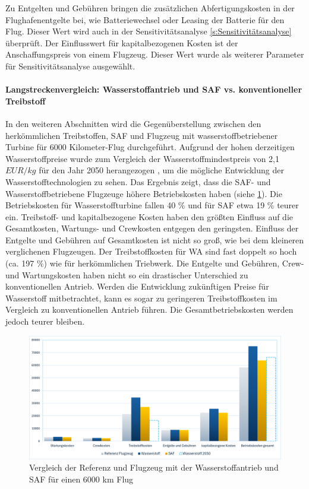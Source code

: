 Zu Entgelten und Gebühren bringen die zusätzlichen Abfertigungskosten in der Flughafenentgelte bei, wie Batteriewechsel oder Leasing der Batterie
für den Flug. Dieser Wert wird auch in der Sensitivitätsanalyse \ref{s:Sensitivitätsanalyse} überprüft. Der Einflusswert für kapitalbezogenen Kosten ist
der Anschaffungspreis von einem Flugzeug. Dieser Wert wurde als weiterer Parameter für Sensitivitätsanalyse ausgewählt.\\

\paragraph{Langstreckenvergleich: Wasserstoffantrieb und SAF vs. konventioneller Treibstoff}
In den weiteren Abschnitten wird die Gegenüberstellung zwischen den herkömmlichen Treibstoffen, SAF
und Flugzeug mit wasserstoffbetriebener Turbine für 6000 Kilometer-Flug durchgeführt. %
Aufgrund der hohen derzeitigen Wasserstoffpreise wurde zum Vergleich der Wasserstoffmindestpreis von 2,1 $EUR/kg$ für den 
Jahr 2050 herangezogen \cite{hoelzen2022hydrogen}, um die mögliche Entwicklung der Wasserstofftechnologien zu sehen.
%
Das Ergebnis zeigt, dass die SAF- und Wasserstoffbetriebene Flugzeuge höhere Betriebskosten haben (siehe \ref{vergleichWA_Ref}).
Die Betriebskosten für Wasserstoffturbine fallen 40 \% und für SAF etwa 19 \% teurer ein.
Treibstoff- und kapitalbezogene Kosten haben den größten Einfluss auf die Gesamtkosten, Wartungs- und Crewkosten entgegen den geringsten.
Einfluss der Entgelte und Gebühren auf Gesamtkosten ist nicht so groß, wie bei dem kleineren verglichenen Flugzeugen.
Der Treibstoffkosten für WA sind fast doppelt so hoch (ca. 197 \%) wie für herkömmlichen Triebwerk. Die Entgelte und Gebühren, 
Crew- und Wartungskosten haben nicht so ein drastischer Unterschied zu konventionellen Antrieb. 
%
Werden die Entwicklung zukünftigen Preise für Wasserstoff mitbetrachtet, kann es sogar zu geringeren Treibstoffkosten im Vergleich 
zu konventionellen Antrieb führen. Die Gesamtbetriebskosten werden jedoch teurer bleiben.

\begin{figure}[h]
	\centering
	\includegraphics[width=0.9\linewidth]{Bilder/VergleichWA_SAF.png}
	\caption[Betriebskosten]{Vergleich der Referenz und Flugzeug mit der Wasserstoffantrieb und SAF für einen 6000 km Flug}
	\label{vergleichWA_Ref}
\end{figure}


